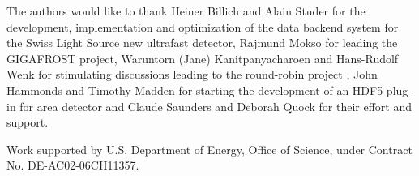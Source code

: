 \documentclass[pdf]{iucr}              %
\begin{document}

The authors would like to thank Heiner Billich and Alain Studer for the development, implementation and optimization of the data backend system for the Swiss Light Source new ultrafast detector, Rajmund Mokso for leading the GIGAFROST project, Waruntorn (Jane) Kanitpanyacharoen and Hans-Rudolf Wenk for stimulating discussions leading to the round-robin project \cite{Kanitpanyacharoen}, John Hammonds and Timothy Madden for starting the development of an HDF5 plug-in for area detector  and Claude Saunders and Deborah Quock for their effort and support.

Work supported by U.S. Department of Energy, Office of Science, under Contract No. DE-AC02-06CH11357. 




 
\end{document}
